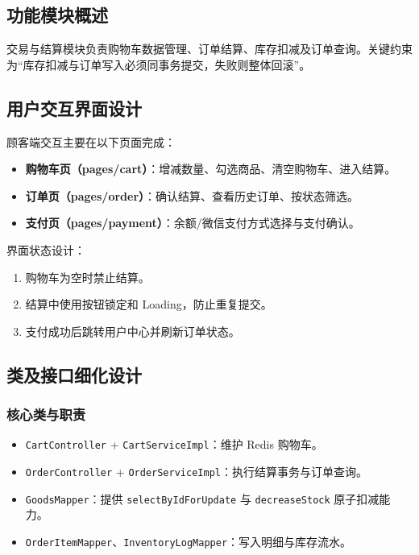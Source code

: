 \subsection{功能模块概述}
交易与结算模块负责购物车数据管理、订单结算、库存扣减及订单查询。关键约束为“库存扣减与订单写入必须同事务提交，失败则整体回滚”。

\subsection{用户交互界面设计}
顾客端交互主要在以下页面完成：
\begin{itemize}[leftmargin=2em]
  \item \textbf{购物车页（pages/cart）}：增减数量、勾选商品、清空购物车、进入结算。
  \item \textbf{订单页（pages/order）}：确认结算、查看历史订单、按状态筛选。
  \item \textbf{支付页（pages/payment）}：余额/微信支付方式选择与支付确认。
\end{itemize}

界面状态设计：
\begin{enumerate}[leftmargin=2em]
  \item 购物车为空时禁止结算。
  \item 结算中使用按钮锁定和 Loading，防止重复提交。
  \item 支付成功后跳转用户中心并刷新订单状态。
\end{enumerate}

\subsection{类及接口细化设计}

\subsubsection{核心类与职责}
\begin{itemize}[leftmargin=2em]
  \item \texttt{CartController} + \texttt{CartServiceImpl}：维护 Redis 购物车。
  \item \texttt{OrderController} + \texttt{OrderServiceImpl}：执行结算事务与订单查询。
  \item \texttt{GoodsMapper}：提供 \texttt{selectByIdForUpdate} 与 \texttt{decreaseStock} 原子扣减能力。
  \item \texttt{OrderItemMapper}、\texttt{InventoryLogMapper}：写入明细与库存流水。
\end{itemize}

